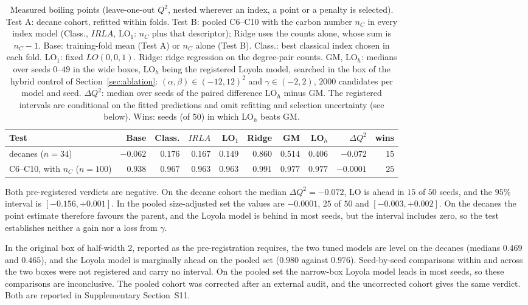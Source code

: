 \documentclass[a5paper, 10pt]{article}
\theoremstyle{plain}
\theoremstyle{remark}
\theoremstyle{definition}
\begin{document}
\begin{table}[htbp]
\centering
\caption{Measured boiling points (leave-one-out $Q^2$, nested wherever an index, a point or a penalty is selected). Test A:
decane cohort, refitted within folds. Test B: pooled C6--C10 with the carbon number
$n_C$ in every index model (Class., $IRLA$,
LO$_1$: $n_C$ plus that descriptor); Ridge uses the counts alone, whose sum is $n_C - 1$. Base: training-fold mean (Test A)
or $n_C$ alone (Test B).
Class.: best classical index chosen in each fold. LO$_1$: fixed
$LO(0,0,1)$. Ridge: ridge regression on the degree-pair counts. GM,
LO$_h$: medians over seeds $0$--$49$ in the wide boxes, LO$_h$
being the registered Loyola model, searched in the box of the hybrid control of Section~\ref{sec:ablation}: $(\alpha,\beta) \in (-12,12)^2$ and
$\gamma \in (-2,2)$, $2000$ candidates per model and seed.
$\Delta Q^2$: median over seeds of the paired difference LO$_h$ minus GM. The registered intervals are conditional on the fitted predictions and omit refitting and selection uncertainty (see below). Wins: seeds (of $50$) in
which LO$_h$ beats GM.}
\label{tab:bp}
\scriptsize
\setlength{\tabcolsep}{1.5pt}
\begin{tabular}{lrrrrrrrrr}
\toprule
Test & Base & Class. & $IRLA$ & LO$_1$ & Ridge & GM & LO$_h$ & $\Delta Q^2$ & wins\\
\midrule
decanes ($n = 34$) & $-0.062$ & $0.176$ & $0.167$ & $0.149$ & $0.860$ & $0.514$ & $0.406$ & $-0.072$ & $15$\\
C6--C10, with $n_C$ ($n = 100$) & $0.938$ & $0.967$ & $0.963$ & $0.963$ & $0.991$ & $0.977$ & $0.977$ & $-0.0001$ & $25$\\
\bottomrule
\end{tabular}
\end{table}

Both pre-registered verdicts are negative. On the decane cohort the
median $\Delta Q^2 = -0.072$, LO is ahead in $15$ of $50$ seeds, and the
$95\%$ interval is $[-0.156, +0.001]$. In the pooled size-adjusted set
the values are $-0.0001$, $25$ of $50$ and $[-0.003, +0.002]$.
On the decanes the point estimate therefore favours the parent, and the
Loyola model is behind in most seeds, but the interval includes zero, so
the test establishes neither a gain nor a loss from $\gamma$.

In the
original box of half-width $2$, reported as the pre-registration
requires, the two tuned models are level on the decanes (medians $0.469$
and $0.465$), and the Loyola model is marginally ahead on the pooled set
($0.980$ against $0.976$). Seed-by-seed comparisons within and across the two boxes were not registered and carry no interval. On the pooled set the narrow-box Loyola model leads in most seeds, so these comparisons are inconclusive. The pooled cohort was corrected after an external audit, and the uncorrected cohort gives the same verdict. Both are reported in Supplementary Section~S11.
\end{document}
